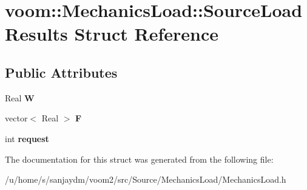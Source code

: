 \hypertarget{structvoom_1_1_mechanics_load_1_1_source_load_results}{
\section{voom::MechanicsLoad::SourceLoadResults Struct Reference}
\label{structvoom_1_1_mechanics_load_1_1_source_load_results}
}
\subsection*{Public Attributes}
\begin{DoxyCompactItemize}
\item 
\hypertarget{structvoom_1_1_mechanics_load_1_1_source_load_results_ac43e13a504f568f44905a739e0873af7}{
Real {\bfseries W}}
\label{structvoom_1_1_mechanics_load_1_1_source_load_results_ac43e13a504f568f44905a739e0873af7}

\item 
\hypertarget{structvoom_1_1_mechanics_load_1_1_source_load_results_ae4ebcc2c4643cde11db4575356d02ee5}{
vector$<$ Real $>$ {\bfseries F}}
\label{structvoom_1_1_mechanics_load_1_1_source_load_results_ae4ebcc2c4643cde11db4575356d02ee5}

\item 
\hypertarget{structvoom_1_1_mechanics_load_1_1_source_load_results_a59415873eaca4e29c3cbfb99501de065}{
int {\bfseries request}}
\label{structvoom_1_1_mechanics_load_1_1_source_load_results_a59415873eaca4e29c3cbfb99501de065}

\end{DoxyCompactItemize}


The documentation for this struct was generated from the following file:\begin{DoxyCompactItemize}
\item 
/u/home/s/sanjaydm/voom2/src/Source/MechanicsLoad/MechanicsLoad.h\end{DoxyCompactItemize}
